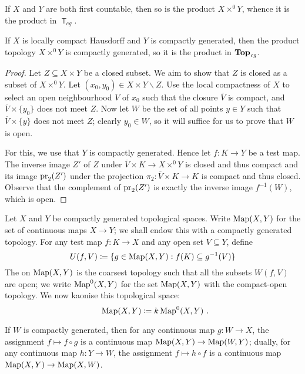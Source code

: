 \begin{exm}
	If $ X $ and $ Y $ are both first countable, then so is the product $ X \times^0 Y $, whence it is the product in $ \Top_{cg} $.
\end{exm}

\begin{prp}
	If $ X $ is locally compact Hausdorff and $ Y $ is compactly generated, then the product topology $ X \times^0 Y $ is compactly generated, so it is the product in $ \textbf{\textup{Top}}_{\textit{cg}} $.
\end{prp}

\begin{proof}
	Let $ Z \subseteq X \times Y $ be a closed subset.
	We aim to show that $ Z $ is closed as a subset of $ X \times^0 Y $.
	Let $ (x_0, y_0) \in  X \times Y \smallsetminus Z $.
	Use the local compactness of $ X $ to select an open neighbourhood $ V $ of $ x_0 $ such that the closure $ \overline{ V } $ is compact, and $ \overline{ V } \times \{ y_0 \} $ does not meet $ Z $.
	Now let $ W $ be the set of all points $ y \in Y $ such that $ \overline{V} \times \{ y \} $ does not meet $ Z $;
	clearly $ y_0 \in W $, so it will suffice for us to prove that $ W $ is open.

	For this, we use that $ Y $ is compactly generated.
	Hence let $ f \colon K \to Y $ be a test map.
	The inverse image $ Z' $ of $ Z $ under $ \overline{ V } \times K \to X \times^0 Y $ is closed and thus compact and its image $ \operatorname{pr}_2(Z') $ under the projection $ \pi_2 \colon \overline{ V } \times K \to K $ is compact and thus closed.
	Observe that the complement of $ \operatorname{pr}_2(Z') $ is exactly the inverse image $ f^{-1}(W) $, which is open.
\end{proof}

\begin{cnstr}
	Let $ X $ and $ Y $ be compactly generated topological spaces.
	Write $ \operatorname{Map}(X, Y) $ for the set of continuous maps $ X \to Y $;
	we shall endow this with a compactly generated topology. 
	For any test map $ f \colon K \to X $ and any open set $ V \subseteq Y $, define
	\[
		U(f, V) \coloneq \{ g \in \operatorname{Map}(X, Y) : f(K) \subseteq g^{-1}(V) \}
	\]
	The  on $ \operatorname{Map}(X, Y) $ is the coarsest topology such that all the subsets $ W(f, V) $ are open;
	we write $ \operatorname{Map}^0(X, Y) $ for the set $ \operatorname{Map}(X, Y) $ with the compact-open topology.
	We now kaonise this topological space:
	\[
		\Map(X, Y) \coloneq k\Map^0(X, Y) \period
	\]

	If $ W $ is compactly generated, then for any continuous map $ g \colon W \to X $, the assignment $ f \mapsto f \circ g $ is a continuous map $ \operatorname{Map}( X, Y ) \to \operatorname{Map}( W, Y ) $;
	dually, for any continuous map $ h \colon Y \to W $, the assignment $ f \mapsto h \circ f $ is a continuous map $ \operatorname{Map}( X, Y ) \to \operatorname{Map}( X, W ) $.
\end{cnstr}

